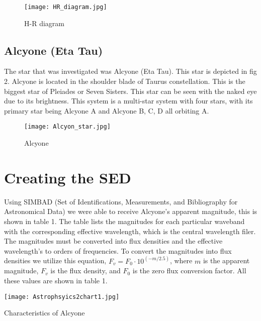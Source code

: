 \documentclass[%
 reprint,
 amsmath,amssymb,
 aps,
]{revtex4-1}
\begin{document}
\begin{figure}[htbp] %
   \centering
   \texttt{[image: HR\_diagram.jpg]} 
   \caption{H-R diagram }
   \label{fig:example}
\end{figure}

\subsection{\label{sec:level3}Alcyone (Eta Tau)}

The star that was investigated was Alcyone (Eta Tau). This star is depicted in fig 2. Alcyone is located in the shoulder blade of Taurus constellation. This is the biggest star of Pleiades or Seven Sisters. This star can be seen with the naked eye due to its brightness. This system is a multi-star system with four stars, with its primary star being Alcyone A and Alcyone B, C, D all orbiting A. 

\begin{figure}[htbp] %
   \centering
   \texttt{[image: Alcyon\_star.jpg]} 
   \caption{Alcyone}
   \label{fig:example}
\end{figure}

\section{\label{sec:level2}Creating the SED}

Using SIMBAD (Set of Identifications, Measurements, and Bibliography for Astronomical Data) we were able to receive Alcyone's apparent magnitude, this is shown in table 1. The table lists the magnitudes for each particular waveband with the corresponding effective wavelength, which is the central wavelength filer. The magnitudes must be converted into flux densities and the effective wavelength's to orders of frequencies. To convert the magnitudes into flux densities we utilize this equation, $F_v=F_0\cdot10^{(-m/2.5)}$, where $m$ is the apparent magnitude, $F_v$ is the flux density, and $F_0$ is the zero flux conversion factor. All these values are shown in table 1.

\begin{table}[htbp] %
   \centering
   \texttt{[image: Astrophsyics2chart1.jpg]} 
   \caption{Characteristics of Alcyone}
   \label{table:example}
\end{table}
\end{document}
